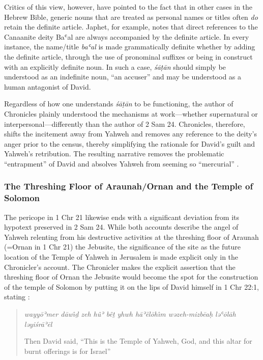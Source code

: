 Critics of this view, however, have pointed to the fact that in other
cases in the Hebrew Bible, generic nouns that are treated as personal
names or titles often \emph{do} retain the definite
article.\autocites[114--117]{japhet2009}[370--390]{japhet1993} Japhet,
for example, notes that direct references to the Canaanite deity Baʿal
are always accompanied by the definite article. In every instance, the
name/title \emph{baʿal} is made grammatically definite whether by adding
the definite article, through the use of pronominal suffixes or being in
construct with an explicitly definite
noun.\autocites[115]{japhet2009}[citing][§126d]{gkc} In such a case,
\emph{śāṭān} should simply be understood as an indefinite noun, ``an
accuser'' and may be understood as a human antagonist of
David.\autocites{stokes_jbl2009}[114--117]{japhet2009}[370--390]{japhet1993}

Regardless of how one understands \emph{śāṭān} to be functioning, the
author of Chronicles plainly understood the mechanisms at work---whether
supernatural or interpersonal---differently than the author of 2 Sam 24.
Chronicles, therefore, shifts the incitement away from Yahweh and
removes any reference to the deity's anger prior to the census, thereby
simplifying the rationale for David's guilt and Yahweh's retribution.
The resulting narrative removes the problematic ``entrapment'' of David
and absolves Yahweh from seeming so ``mercurial''
\autocite[4]{rollston_keith-stuckenbruck2016}.

\subsubsection{The Threshing Floor of Araunah/Ornan and the Temple of
Solomon}\label{the-threshing-floor-of-araunahornan-and-the-temple-of-solomon}

The pericope in 1 Chr 21 likewise ends with a significant deviation from
its hypotext preserved in 2 Sam 24. While both accounts describe the
angel of Yahweh relenting from his destructive activities at the
threshing floor of Araunah (=Ornan in 1 Chr 21) the Jebusite, the
significance of the site as the future location of the Temple of Yahweh
in Jerusalem is made explicit only in the Chronicler's account. The
Chronicler makes the explicit assertion that the threshing floor of
Ornan the Jebusite would become the spot for the construction of the
temple of Solomon by putting it on the lips of David himself in 1 Chr
22:1, stating :

\begin{quote}
\emph{wayyōʾmer dāwı̂ḏ zeh hûʾ bêṯ yhwh hāʾĕlōhı̂m wəzeh-mizbēaḥ ləʿōlāh
ləyiśrāʾēl}

Then David said, ``This is the Temple of Yahweh, God, and this altar for
burnt offerings is for Israel''
\end{quote}

